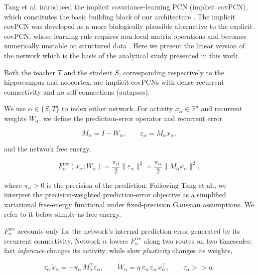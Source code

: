 \documentclass[10pt,letterpaper]{article}
\theoremstyle{plain}
\theoremstyle{remark}
\begin{document}
Tang et al. introduced the implicit covariance-learning PCN (implicit covPCN), which constitutes the basic building block of our architecture \cite{tang2023covpcn}. The implicit covPCN was developed as a more biologically plausible alternative to the explicit covPCN, whose learning rule requires non-local matrix operations and becomes numerically unstable on structured data \cite{friston2003learning,friston2005theory,bogacz2017tutorial,tang2023covpcn}. Here we present the linear version of the network which is the basis of the analytical study presented in this work.

Both the teacher $T$ and the student $S$, corresponding respectively to the hippocampus and neocortex, are implicit covPCNs with dense recurrent connectivity and no self-connections (autapses).
\par\vspace{\baselineskip}\noindent
We use $\alpha\in\{S,T\}$ to index either network. For activity $x_\alpha\in\mathbb R^d$ and recurrent weights $W_\alpha$, we define the prediction-error operator and recurrent error

\begin{equation}
M_\alpha=I-W_\alpha,
\qquad
\varepsilon_\alpha=M_\alpha x_\alpha,
\label{eq:single-error}
\end{equation}

and the network free energy,

\begin{equation}
F_\alpha^{\mathrm{rec}}(x_\alpha;W_\alpha)=\frac{\pi_\alpha}{2}\|\varepsilon_\alpha\|^2
=\frac{\pi_\alpha}{2}\|M_\alpha x_\alpha\|^2,
\label{eq:single-energy}
\end{equation}

where $\pi_\alpha>0$ is the precision of the prediction. Following Tang et al., we interpret the precision-weighted prediction-error objective as a simplified variational free-energy functional under fixed-precision Gaussian assumptions. We refer to it below simply as free energy.

$F_\alpha^{\mathrm{rec}}$ accounts only for the network's internal prediction error generated by its recurrent connectivity. Network $\alpha$ lowers $F_\alpha^{\mathrm{rec}}$ along two routes on two timescales: fast \emph{inference} changes its activity, while slow \emph{plasticity} changes its weights,

\begin{equation}
\tau_\alpha\,\dot x_\alpha=-\pi_\alpha\,M_\alpha^\top\varepsilon_\alpha,
\qquad
\dot W_\alpha=\eta\,\pi_\alpha\,\varepsilon_\alpha\,x_\alpha^\top, 
\qquad
\tau_\alpha >> \eta,
\label{eq:single-dynamics}
\end{equation}
\end{document}
